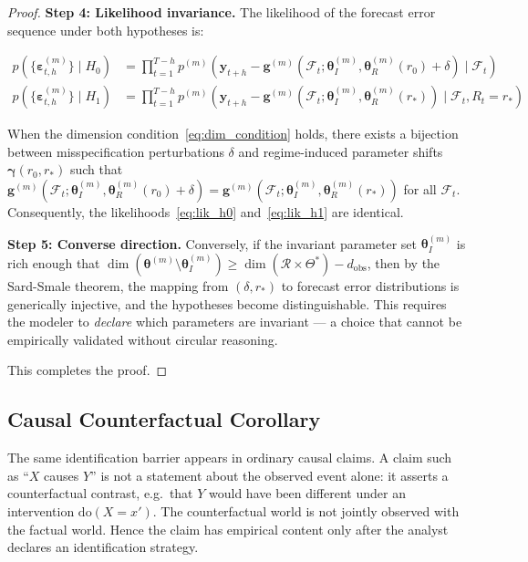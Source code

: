 \documentclass[12pt,a4paper]{article}
\begin{document}
\begin{proof}
\medskip\noindent
\textbf{Step 4: Likelihood invariance.}
The likelihood of the forecast error sequence under both hypotheses is:

\begin{align}
    p(\{\boldsymbol{\varepsilon}_{t,h}^{(m)}\} \mid H_0) &=
    \prod_{t=1}^{T-h} p^{(m)}\left(\mathbf{y}_{t+h} -
    \mathbf{g}^{(m)}(\mathcal{F}_t; \boldsymbol{\theta}^{(m)}_I,
    \boldsymbol{\theta}^{(m)}_R(r_0) + \delta) \mid
    \mathcal{F}_t\right) \label{eq:lik_h0} \\
    p(\{\boldsymbol{\varepsilon}_{t,h}^{(m)}\} \mid H_1) &=
    \prod_{t=1}^{T-h} p^{(m)}\left(\mathbf{y}_{t+h} -
    \mathbf{g}^{(m)}(\mathcal{F}_t; \boldsymbol{\theta}^{(m)}_I,
    \boldsymbol{\theta}^{(m)}_R(r_*)) \mid
    \mathcal{F}_t, R_t = r_*\right) \label{eq:lik_h1}
\end{align}

When the dimension condition~\eqref{eq:dim_condition} holds, there
exists a bijection between misspecification perturbations $\delta$
and regime-induced parameter shifts $\boldsymbol{\gamma}(r_0, r_*)$
such that $\mathbf{g}^{(m)}(\mathcal{F}_t; \boldsymbol{\theta}^{(m)}_I,
\boldsymbol{\theta}^{(m)}_R(r_0) + \delta) =
\mathbf{g}^{(m)}(\mathcal{F}_t; \boldsymbol{\theta}^{(m)}_I,
\boldsymbol{\theta}^{(m)}_R(r_*))$ for all $\mathcal{F}_t$.
Consequently, the likelihoods~\eqref{eq:lik_h0} and~\eqref{eq:lik_h1}
are identical.

\medskip\noindent
\textbf{Step 5: Converse direction.}
Conversely, if the invariant parameter set $\boldsymbol{\theta}^{(m)}_I$
is rich enough that $\dim(\boldsymbol{\theta}^{(m)} \setminus
\boldsymbol{\theta}^{(m)}_I) \geq \dim(\mathcal{R} \times \Theta^*) -
d_{\text{obs}}$, then by the Sard-Smale theorem, the mapping from
$(\delta, r_*)$ to forecast error distributions is generically
injective, and the hypotheses become distinguishable.  This requires
the modeler to \emph{declare} which parameters are invariant --- a
choice that cannot be empirically validated without circular reasoning.

This completes the proof.
\end{proof}

\subsection{Causal Counterfactual Corollary}
\label{subsec:causal_counterfactual}

The same identification barrier appears in ordinary causal claims.  A claim
such as ``$X$ causes $Y$'' is not a statement about the observed event alone:
it asserts a counterfactual contrast, e.g.\ that $Y$ would have been different
under an intervention $\mathrm{do}(X=x')$.  The counterfactual world is not
jointly observed with the factual world.  Hence the claim has empirical
content only after the analyst declares an identification strategy.
\end{document}
